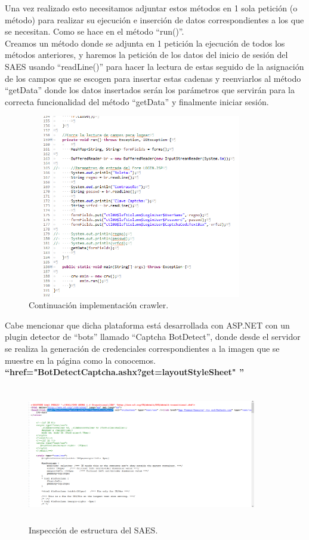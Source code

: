 	\noindent Una vez realizado esto necesitamos adjuntar estos métodos en 1 sola petición (o método) para realizar su ejecución e inserción de datos correspondientes a los que se necesitan.
	Como se hace en el método “run()”. \\
	
	\noindent Creamos un método donde se adjunta en 1 petición la ejecución de todos los métodos anteriores, y haremos la petición de los datos del inicio de sesión del SAES usando “readLine()” para hacer la lectura de estas seguido de la asignación de los campos que se escogen para insertar estas cadenas y reenviarlos al método “getData” donde los datos insertados serán los parámetros que servirán para la correcta funcionalidad del método “getData” y finalmente iniciar sesión.\\
	\begin{figure} [hbt!]
		\centering
		\includegraphics[width=10cm, height=8cm]{Imagenes/Crawler/Codigo6}
		\caption{Continuación implementación crawler.}
		\label{codigo6}
	\end{figure}
\pagebreak
	\noindent Cabe mencionar que dicha plataforma está desarrollada con ASP.NET con un plugin detector de “bots” llamado “Captcha BotDetect”, donde desde el servidor se realiza la generación de credenciales correspondientes a la imagen que se muestre en la página como la conocemos.\\
	\textbf{“href="BotDetectCaptcha.ashx?get=layoutStyleSheet" ”}\\
	\begin{figure} [hbt!]
		\centering
		\includegraphics[width=10cm, height=6cm]{Imagenes/Crawler/ASP2}
		\caption{Inspección de estructura del SAES.}
		\label{asp2}
	\end{figure}

